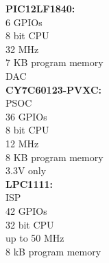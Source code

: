 \textbf{PIC12LF1840:}\\
6 GPIOs\\
8 bit CPU\\
32 MHz\\
7 KB program memory\\
DAC\\

\textbf{CY7C60123-PVXC:}\\
PSOC\\
36 GPIOs\\
8 bit CPU\\
12 MHz\\
8 KB program memory\\
3.3V only \\

\textbf{LPC1111:}\\
ISP\\
42 GPIOs\\
32 bit CPU\\
up to 50 MHz\\
8 kB program memory\\